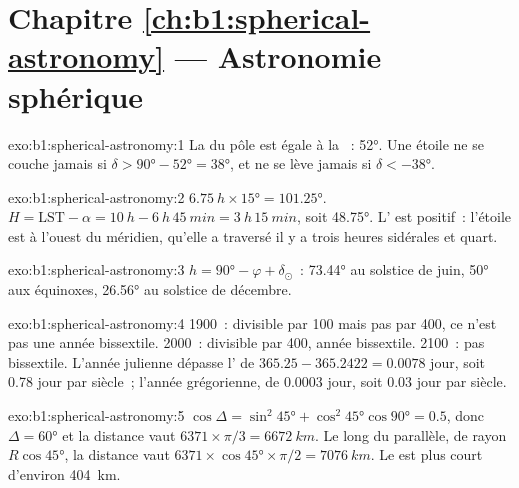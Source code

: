 \section*{Chapitre \ref{ch:b1:spherical-astronomy} --- Astronomie sphérique}

\begin{solution}{exo:b1:spherical-astronomy:1}
La  du pôle est égale à la ~: \ang{52}. Une étoile ne se couche
jamais si $\delta > \ang{90} - \ang{52} = \ang{38}$, et ne se lève jamais si
$\delta < \ang{-38}$.
\end{solution}

\begin{solution}{exo:b1:spherical-astronomy:2}
$\qty{6.75}{h}\times\ang{15} = \ang{101.25}$. $H = \mathrm{LST} - \alpha =
\qty{10}{h} - \qty{6}{h}\,\qty{45}{min} = \qty{3}{h}\,\qty{15}{min}$, soit
\ang{48.75}. L' est positif~: l'étoile est à l'ouest du méridien,
qu'elle a traversé il y a trois heures sidérales et quart.
\end{solution}

\begin{solution}{exo:b1:spherical-astronomy:3}
$h = \ang{90} - \varphi + \delta_\odot$~: \ang{73.44} au solstice de juin,
\ang{50} aux équinoxes, \ang{26.56} au solstice de décembre.
\end{solution}

\begin{solution}{exo:b1:spherical-astronomy:4}
1900~: divisible par 100 mais pas par 400, ce n'est pas une année bissextile.
2000~: divisible par 400, année bissextile. 2100~: pas bissextile. L'année
julienne dépasse l' de $365.25 - 365.2422 = 0.0078$ jour, soit
\num{0.78} jour par siècle~; l'année grégorienne, de $0.0003$ jour, soit
\num{0.03} jour par siècle.
\end{solution}

\begin{solution}{exo:b1:spherical-astronomy:5}
$\cos\Delta = \sin^2\ang{45} + \cos^2\ang{45}\cos\ang{90} = 0.5$, donc
$\Delta = \ang{60}$ et la distance vaut $6371\times\pi/3 = \qty{6672}{km}$.
Le long du parallèle,  de rayon $R\cos\ang{45}$, la distance vaut
$6371\times\cos\ang{45}\times\pi/2 = \qty{7076}{km}$. Le  est plus
court d'environ \qty{404}{km}.
\end{solution}

